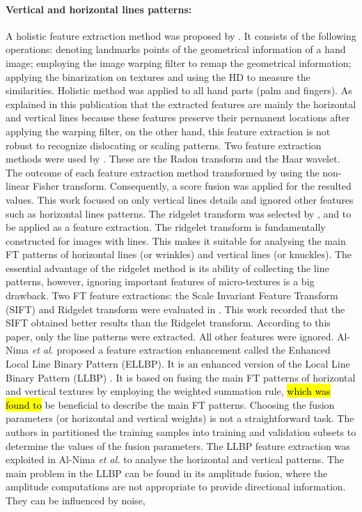 \documentclass[review]{elsarticle}
\begin{document}
	\paragraph{\textbf{Vertical and horizontal lines patterns:}} A holistic feature extraction method was proposed by \cite{ying2007identity}. It consists of the following operations: denoting landmarks points of the geometrical information of a hand image; employing the image warping filter to remap the geometrical information; applying the binarization on textures and using the HD to measure the similarities. Holistic method was applied to all hand parts (palm and fingers).  
	As explained in this publication that the extracted features are mainly the horizontal and vertical lines because these features preserve their permanent locations after applying the warping filter, on the other hand, this feature extraction is not robust to recognize dislocating or scaling patterns. Two feature extraction methods were used by \cite{nanni2009multi}. These are the Radon transform \cite{Radon_Transform} and the Haar wavelet. The outcome of each feature extraction method transformed by using the non-linear Fisher transform. Consequently, a score fusion was applied for the resulted values. This work focused on only vertical lines details and ignored other features such as horizontal lines patterns. The ridgelet transform was selected by \cite{Michael2010Robust}, \cite{michael2010innovative} and \cite{Goh2010Bi-modal} to be applied as a feature extraction. The ridgelet transform is fundamentally constructed for images with lines. This makes it suitable for analysing the main FT patterns of horizontal lines (or wrinkles) and vertical lines (or knuckles). The essential advantage of the ridgelet method is its ability of collecting the line patterns, however, ignoring important features of micro-textures is a big drawback. Two FT feature extractions: the Scale Invariant Feature Transform (SIFT) \cite{SIFT_FeatureExtreaction} and Ridgelet transform were evaluated in \cite{Bhaskar2014Hand}. This work recorded that the SIFT obtained better results than the Ridgelet transform. According to this paper, only the line patterns were extracted. All other features were ignored. Al-Nima \textit{et al.} \cite{Al-Nima2017Robust} proposed a feature extraction enhancement called the Enhanced Local Line Binary Pattern (ELLBP). It is an enhanced version of the Local Line Binary Pattern (LLBP) \cite{Petpon2009Face,Efficient_LLBP}. It is based on fusing the main FT patterns of horizontal and vertical textures by employing the weighted summation rule, \hl{which was found to} be beneficial to describe the main FT patterns. Choosing the fusion parameters (or horizontal and vertical weights) is not a straightforward task. The authors in \cite{Al-Nima2017Robust} partitioned the training samples into training and validation subsets to determine the values of the fusion parameters. The LLBP feature extraction was exploited in Al-Nima \textit{et al.} \cite{Al-Nima2017efficient} to analyse the horizontal and vertical patterns. The main problem in the LLBP can be found in its amplitude fusion, where the amplitude computations are not appropriate to provide directional information. They can be influenced by noise, 
\end{document}
